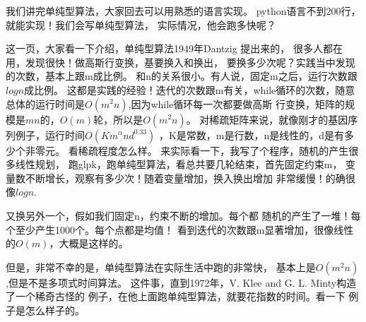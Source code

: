 {{
	我们讲完单纯型算法，大家回去可以用熟悉的语言实现。
	python语言不到200行，就能实现！我们会写单纯型算法，
	实际情况，他会跑多快呢？
}

{
	这一页，大家看一下介绍，单纯型算法1949年Dantzig 提出来的，
	很多人都在用，发现很快！做高斯行变换，基要换入和换出，
	要换多少次呢？实践当中发现的次数，基本上跟m成比例。
	和n的关系很小。有人说，固定m之后，运行次数跟$logn$成比例。
	这都是实践的经验！迭代的次数跟m有关，while循环的次数，随意
	总体的运行时间是$O(m^2n)$,因为while循环每一次都要做高斯
	行变换，矩阵的规模是$mn$的，$O(m)$轮，所以是$O(m^2n)$。
	对稀疏矩阵来说，就像刚才的基因序列例子，运行时间$O(Km^\alpha n d^{0.33})$
	，K是常数，m是行数，n是线性的，d是有多少个非零元。
	看稀疏程度怎么样。
}
{
	来实际看一下，我写了个程序，随机的产生很多线性规划，
	跑glpk，跑单纯型算法，看总共要几轮结束，首先固定约束m，
	变量数不断增长，观察有多少次！随着变量增加，换入换出增加
	非常缓慢！的确很像$logn$.
}
{
	又换另外一个，假如我们固定n，约束不断的增加。每个都
	随机的产生了一堆！每个至少产生1000个。每个点都是均值！
	看到迭代的次数跟m显著增加，很像线性的$O(m)$，大概是这样的。

}
{
	但是，非常不幸的是，单纯型算法在实际生活中跑的非常快，
	基本上是$O(m^2n)$,但是不是多项式时间算法。
}
{
	这件事，直到1972年，V. Klee and G. L. Minty构造了一个稀奇古怪的
	例子，在他上面跑单纯型算法，就要花指数的时间。看一下
	例子是怎么样子的。
}

}
